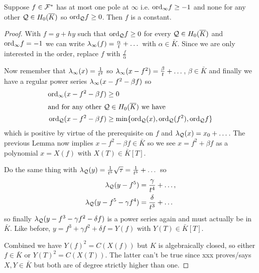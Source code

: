 \documentclass[english,11pt,a4paper]{article}
\begin{document}
\begin{lemma}
	Suppose $f \in \mathcal{F}^*$ has at most one pole at $\infty$ i.e. $\text{ord}_{\infty} f \geq -1$ and none for any other $\mathcal{Q} \in H_0(\overline K)$ so $\text{ord}_{\mathcal{Q}} f \geq 0$. Then $f$ is a constant.

	\begin{proof}
		With $f = g+hy$ such that $\text{ord}_{\mathcal{Q}} f \geq 0$ for every $\mathcal{Q} \in H_0(\overline K)$ and $\text{ord}_{\infty} f = -1$ we can write $\lambda_{\infty} (f) = \frac \alpha t + \dots$ with $\alpha \in \bar K$. Since we are only interested in the order, replace $f$ with $\frac f \alpha$

		Now remember that $\lambda_{\infty} (x) = \frac{1}{t^2}$ so $\lambda_{\infty} (x - f^2) = \frac \beta t + \dots$, $\beta \in \bar K$ and finally we have a regular power series $\lambda_{\infty} (x - f^2 - \beta f)$ so
		\begin{align*}
		  \text{ord}_{\infty} (x - f^2 - \beta f) &\geq 0\\
		\intertext{and for any other $\mathcal{Q} \in H_0(\overline K)$ we have}
		  \text{ord}_{\mathcal{Q}} (x - f^2 - \beta f) &\geq \min \{ \text{ord}_{\mathcal{Q}} (x) , \text{ord}_{\mathcal{Q}} (f^2) , \text{ord}_{\mathcal{Q}} f \}
		\end{align*}
		which is positive by virtue of the prerequisite on $f$ and $\lambda_{\mathcal{Q}}(x) = x_0 + \dots$. The previous Lemma now implies $x - f^2 - \beta f \in \bar K$ so we see $x = f^2 + \beta f$ as a polynomial $x = X(f)$ with $X(T) \in \bar K[T]$.

		Do the same thing with $\lambda_{\mathcal{Q}}(y) = \frac{1}{t^5}\sqrt \tau = \frac{1}{t^5} + \dots$ so
		\begin{align*}
		  \lambda_{\mathcal{Q}} (y - f^5) &= \frac{\gamma}{t^4} + \dots,\\
		  \lambda_{\mathcal{Q}} (y - f^5 - \gamma f^4) &= \frac{\delta}{t^3} + \dots
		\end{align*}
		so finally $\lambda_{\mathcal{Q}} (y - f^3 - \gamma f^2 - \delta f)$ is a power series again and must actually be in $\bar K$. Like before, $y = f^3 + \gamma f^2 + \delta f = Y(f)$ with $Y(T)\in \bar K[T]$.

		Combined we have $Y(f)^2 = C(X(f))$ but $K$ is algebraically closed, so either $f \in \bar K$ or $Y(T)^2 = C(X(T))$. The latter can't be true since xxx proves/says $X, Y \in \bar K$ but both are of degree strictly higher than one. %
	\end{proof}
\end{lemma}
\end{document}
